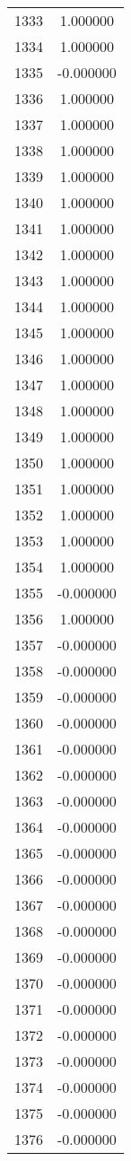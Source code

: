\documentclass[12pt]{article}
\begin{document}
\begin{longtable}{@{}cc@{}}
1333 & 1.000000 \\
1334 & 1.000000 \\
1335 & -0.000000 \\
1336 & 1.000000 \\
1337 & 1.000000 \\
1338 & 1.000000 \\
1339 & 1.000000 \\
1340 & 1.000000 \\
1341 & 1.000000 \\
1342 & 1.000000 \\
1343 & 1.000000 \\
1344 & 1.000000 \\
1345 & 1.000000 \\
1346 & 1.000000 \\
1347 & 1.000000 \\
1348 & 1.000000 \\
1349 & 1.000000 \\
1350 & 1.000000 \\
1351 & 1.000000 \\
1352 & 1.000000 \\
1353 & 1.000000 \\
1354 & 1.000000 \\
1355 & -0.000000 \\
1356 & 1.000000 \\
1357 & -0.000000 \\
1358 & -0.000000 \\
1359 & -0.000000 \\
1360 & -0.000000 \\
1361 & -0.000000 \\
1362 & -0.000000 \\
1363 & -0.000000 \\
1364 & -0.000000 \\
1365 & -0.000000 \\
1366 & -0.000000 \\
1367 & -0.000000 \\
1368 & -0.000000 \\
1369 & -0.000000 \\
1370 & -0.000000 \\
1371 & -0.000000 \\
1372 & -0.000000 \\
1373 & -0.000000 \\
1374 & -0.000000 \\
1375 & -0.000000 \\
1376 & -0.000000 \\

\end{longtable}
\end{document}
